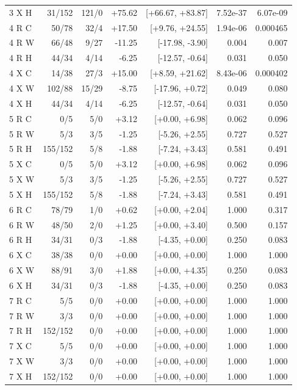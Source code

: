 \begin{longtable}{lrrrrrr}
3 X H & 31/152 & 121/0 & +75.62 & [+66.67, +83.87] & 7.52e-37 & 6.07e-09\\
4 R C & 50/78 & 32/4 & +17.50 & [+9.76, +24.55] & 1.94e-06 & 0.000465\\
4 R W & 66/48 & 9/27 & -11.25 & [-17.98, -3.90] & 0.004 & 0.007\\
4 R H & 44/34 & 4/14 & -6.25 & [-12.57, -0.64] & 0.031 & 0.050\\
4 X C & 14/38 & 27/3 & +15.00 & [+8.59, +21.62] & 8.43e-06 & 0.000402\\
4 X W & 102/88 & 15/29 & -8.75 & [-17.96, +0.72] & 0.049 & 0.080\\
4 X H & 44/34 & 4/14 & -6.25 & [-12.57, -0.64] & 0.031 & 0.050\\
5 R C & 0/5 & 5/0 & +3.12 & [+0.00, +6.98] & 0.062 & 0.096\\
5 R W & 5/3 & 3/5 & -1.25 & [-5.26, +2.55] & 0.727 & 0.527\\
5 R H & 155/152 & 5/8 & -1.88 & [-7.24, +3.43] & 0.581 & 0.491\\
5 X C & 0/5 & 5/0 & +3.12 & [+0.00, +6.98] & 0.062 & 0.096\\
5 X W & 5/3 & 3/5 & -1.25 & [-5.26, +2.55] & 0.727 & 0.527\\
5 X H & 155/152 & 5/8 & -1.88 & [-7.24, +3.43] & 0.581 & 0.491\\
6 R C & 78/79 & 1/0 & +0.62 & [+0.00, +2.04] & 1.000 & 0.317\\
6 R W & 48/50 & 2/0 & +1.25 & [+0.00, +3.40] & 0.500 & 0.157\\
6 R H & 34/31 & 0/3 & -1.88 & [-4.35, +0.00] & 0.250 & 0.083\\
6 X C & 38/38 & 0/0 & +0.00 & [+0.00, +0.00] & 1.000 & 1.000\\
6 X W & 88/91 & 3/0 & +1.88 & [+0.00, +4.35] & 0.250 & 0.083\\
6 X H & 34/31 & 0/3 & -1.88 & [-4.35, +0.00] & 0.250 & 0.083\\
7 R C & 5/5 & 0/0 & +0.00 & [+0.00, +0.00] & 1.000 & 1.000\\
7 R W & 3/3 & 0/0 & +0.00 & [+0.00, +0.00] & 1.000 & 1.000\\
7 R H & 152/152 & 0/0 & +0.00 & [+0.00, +0.00] & 1.000 & 1.000\\
7 X C & 5/5 & 0/0 & +0.00 & [+0.00, +0.00] & 1.000 & 1.000\\
7 X W & 3/3 & 0/0 & +0.00 & [+0.00, +0.00] & 1.000 & 1.000\\
7 X H & 152/152 & 0/0 & +0.00 & [+0.00, +0.00] & 1.000 & 1.000\\
\bottomrule\end{longtable}